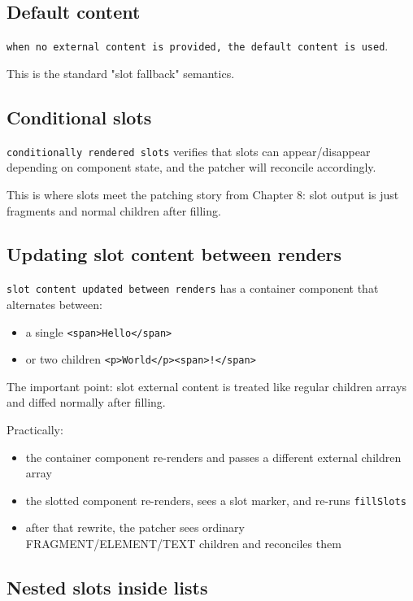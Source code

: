 \subsection{Default content}

\texttt{when no external content is provided, the default content is used}.

This is the standard "slot fallback" semantics.

\subsection{Conditional slots}

\texttt{conditionally rendered slots} verifies that slots can appear/disappear depending on component state, and the patcher will reconcile accordingly.

This is where slots meet the patching story from Chapter 8: slot output is just fragments and normal children after filling.

\subsection{Updating slot content between renders}

\texttt{slot content updated between renders} has a container component that alternates between:

\begin{itemize}
  \item a single \texttt{<span>Hello</span>}
  \item or two children \texttt{<p>World</p><span>!</span>}
\end{itemize}

The important point: slot external content is treated like regular children arrays and diffed normally after filling.

Practically:

\begin{itemize}
  \item the container component re-renders and passes a different external children array
  \item the slotted component re-renders, sees a slot marker, and re-runs \texttt{fillSlots}
  \item after that rewrite, the patcher sees ordinary FRAGMENT/ELEMENT/TEXT children and reconciles them
\end{itemize}

\subsection{Nested slots inside lists}

